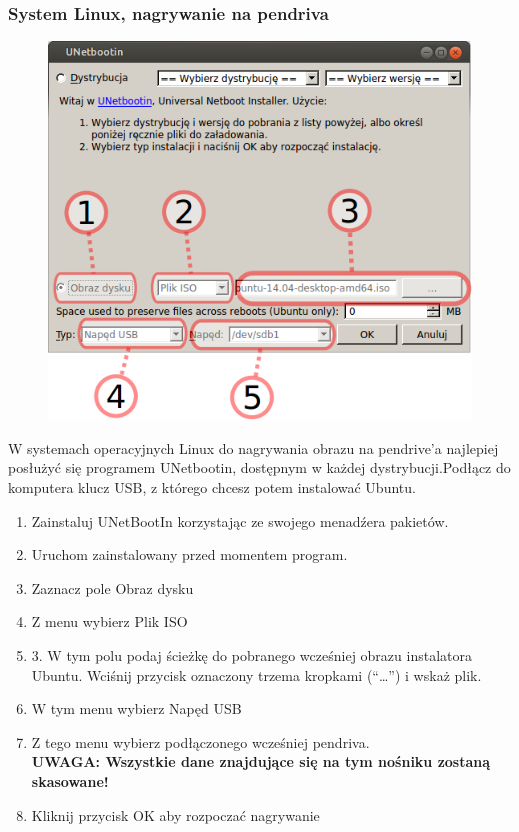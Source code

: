 \subsubsection{System Linux, nagrywanie na pendriva}
\begin{figure}
		\includegraphics[width=\linewidth]{images/instalacja_nagrywanie_obrazu_linux.png}
\end{figure}
W systemach operacyjnych Linux do nagrywania obrazu na pendrive'a najlepiej posłużyć się programem UNetbootin, dostępnym w każdej dystrybucji.Podłącz do komputera klucz USB, z którego chcesz potem instalować Ubuntu.
\begin{enumerate}
\item Zainstaluj UNetBootIn korzystając ze swojego menadźera pakietów.
\item Uruchom zainstalowany przed momentem program.
\item Zaznacz pole Obraz dysku
\item Z menu wybierz Plik ISO
\item 3. W tym polu podaj ścieżkę do pobranego wcześniej obrazu instalatora Ubuntu. Wciśnij przycisk oznaczony trzema kropkami (“\ldots”) i wskaż plik.
\item W tym menu wybierz Napęd USB
\item Z tego menu wybierz podłączonego wcześniej pendriva.\\
\textbf{UWAGA: Wszystkie dane znajdujące się na tym nośniku zostaną skasowane!}
\item Kliknij przycisk OK aby rozpoczać nagrywanie
\end{enumerate}
\clearpage
